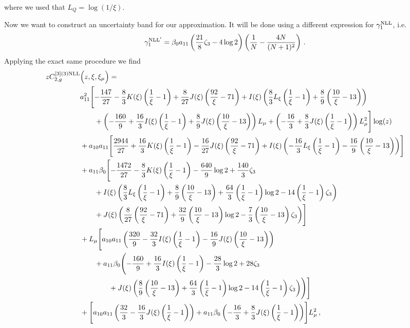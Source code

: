 \documentclass[a4paper]{article}
\begin{document}
	\endgroup
where we used that $L_Q = \log\left(1/\xi\right)$.

Now we want to construct an uncertainty band for our approximation. It will be done using a different expression for $\gamma_1^{\rm NLL}$, i.e.\
\begin{equation}
	\gamma_1^{\rm NLL'} = \beta_0 a_{11} \left(\frac{21}{8} \zeta_3 - 4 \log 2\right)\left(\frac{1}{N} - \frac{4N}{(N+1)^2}\right)\,.
\end{equation}
Applying the exact same procedure we find
\begingroup
\allowdisplaybreaks
\begin{align}
		z C_{2,g}^{[3](3) \rm NLL}&\Bigl(z,\xi,\xi_\mu\Bigr)= \notag\\
		& a_{11}^2\Biggl[-\frac{147}{27} - \frac{8}{3} K(\xi) \left(\frac{1}{\xi}-1\right) + \frac{8}{27} J(\xi) \left(\frac{92}{\xi} - 71\right) + I(\xi) \left(\frac{8}{3} L_\xi \left(\frac{1}{\xi}-1\right) + \frac{8}{9} \left(\frac{10}{\xi} - 13\right)\right)\notag \\
		& \qquad + \left(-\frac{160}{9} + \frac{16}{3} I(\xi) \left(\frac{1}{\xi}-1\right) + \frac{8}{9} J(\xi) \left(\frac{10}{\xi} - 13\right)\right) L_\mu + \left(-\frac{16}{3} + \frac{8}{3} J(\xi) \left(\frac{1}{\xi}-1\right)\right) L_\mu^2\Biggr] \log(z) \notag\\
		& + a_{10} a_{11} \Biggl[\frac{2944}{27} + \frac{16}{3} K(\xi) \left(\frac{1}{\xi} - 1\right) - \frac{16}{27} J(\xi) \left(\frac{92}{\xi} - 71\right) + I(\xi) \left(-\frac{16}{3} L_\xi \left(\frac{1}{\xi} - 1\right) - \frac{16}{9} \left(\frac{10}{\xi} - 13\right)\right) \Biggr]\notag \\
		& + a_{11} \beta_0 \Biggl[ -\frac{1472}{27} - \frac{8}{3} K(\xi) \left(\frac{1}{\xi} - 1\right) - \frac{640}{9} \log 2 + \frac{140}{3} \zeta_3 \notag\\
		& \qquad + I(\xi) \left(\frac{8}{3} L_\xi \left(\frac{1}{\xi} - 1\right) + \frac{8}{9} \left(\frac{10}{\xi} - 13\right) + \frac{64}{3} \left(\frac{1}{\xi} - 1\right) \log 2 - 14 \left(\frac{1}{\xi} - 1\right) \zeta_3\right) \notag\\
		& \qquad + J(\xi) \left(\frac{8}{27} \left(\frac{92}{\xi} - 71\right) + \frac{32}{9} \left(\frac{10}{\xi} - 13\right) \log 2 - \frac{7}{3} \left(\frac{10}{\xi} - 13\right) \zeta_3 \right)\Biggr] \notag\\
		& + L_\mu \Biggl[a_{10} a_{11} \left(\frac{320}{9} - \frac{32}{3} I(\xi) \left(\frac{1}{\xi} - 1\right) - \frac{16}{9} J(\xi) \left(\frac{10}{\xi} - 13\right)\right)\notag \\
		& \qquad + a_{11} \beta_0 \Biggl(-\frac{160}{9} + \frac{16}{3} I(\xi) \left(\frac{1}{\xi} - 1\right) - \frac{28}{3} \log 2 + 28 \zeta_3 \notag\\
		& \qquad \qquad+ J(\xi) \left(\frac{8}{9} \left(\frac{10}{\xi} - 13\right) + \frac{64}{3} \left(\frac{1}{\xi} - 1\right) \log 2 - 14 \left(\frac{1}{\xi} - 1\right) \zeta_3 \right)\Biggr)\Biggr]\notag\\
		& + \Biggl[a_{10} a_{11} \left(\frac{32}{3} - \frac{16}{3} J(\xi) \left(\frac{1}{\xi} - 1\right)\right) + a_{11} \beta_0 \left(-\frac{16}{3} + \frac{8}{3} J(\xi) \left(\frac{1}{\xi} - 1\right)\right)\Biggr] L_\mu^2\,,
	\end{align}
\end{document}
